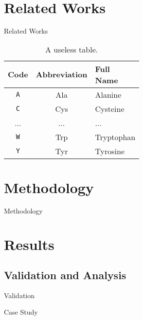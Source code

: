 \documentclass[
  xcolor={hyperref,svgnames,x11names,table},
  hyperref={pdfencoding=unicode,plainpages=false,pdfpagelabels=true,breaklinks=true},
  brazilian,english,12pt,aspectratio=149,
]{beamer}
\begin{document}
\section{Related Works}

\begin{frame}{Related Works}

  \begin{table}[H] %
    \centering
    \singlespacing\vspace{-\baselineskip}
    \begin{tabular}{ccl}
      \toprule
      Code      & Abbreviation  & \makecell{Full\\Name} \\
      \midrule
      \texttt{A}  & Ala          & Alanine \\
      \texttt{C}  & Cys          & Cysteine \\
      ...         & ...          & ... \\
      \texttt{W}  & Trp          & Tryptophan \\
      \texttt{Y}  & Tyr          & Tyrosine \\
      \bottomrule
    \end{tabular}
    \caption*{A useless table.} %
  \end{table}

\end{frame}

\section{Methodology}

\begin{frame}{Methodology}
\end{frame}

\section{Results}

\subsection{Validation and Analysis}

\begin{frame}{Validation}
\end{frame}

\begin{frame}{Case Study}
\end{frame}
\end{document}
